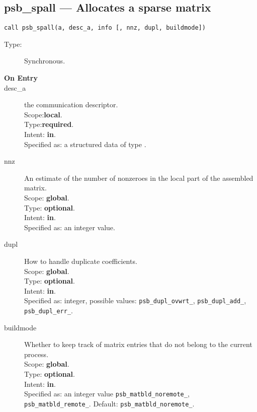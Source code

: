 


%
%
\clearpage\subsection{psb\_spall --- Allocates a sparse matrix}

\begin{verbatim}
call psb_spall(a, desc_a, info [, nnz, dupl, buildmode])
\end{verbatim}

\begin{description}
\item[Type:] Synchronous.
\item[\bf On Entry]
\item[desc\_a] the communication descriptor.\\
Scope:{\bf local}.\\
Type:{\bf required}.\\
Intent: {\bf in}.\\
Specified as: a structured data of type \descdata.
\item[nnz] An estimate of the number of nonzeroes in the local
  part of the assembled matrix.\\ 
Scope: {\bf global}.\\
Type: {\bf optional}.\\
Intent: {\bf in}.\\
Specified as: an integer value. 
\item[dupl] How to handle duplicate coefficients.\\
Scope: {\bf global}.\\
Type: {\bf optional}.\\
Intent: {\bf in}.\\
Specified as: integer, possible values: \verb|psb_dupl_ovwrt_|,
\verb|psb_dupl_add_|, \verb|psb_dupl_err_|.
\item[buildmode] Whether to keep track of matrix entries that do not
  belong to the current process.\\ 
Scope: {\bf global}.\\
Type: {\bf optional}.\\
Intent: {\bf in}.\\
Specified as: an integer value \verb|psb_matbld_noremote_|,
\verb|psb_matbld_remote_|.  Default:  \verb|psb_matbld_noremote_|.
\end{description}

